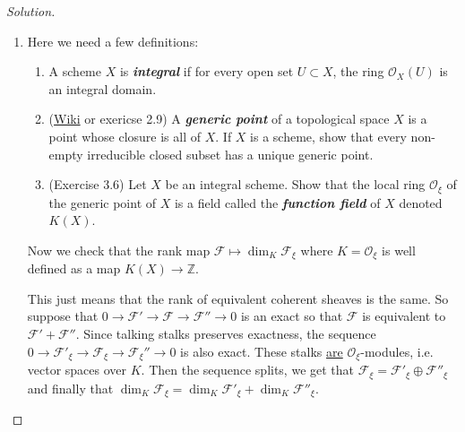 \begin{proof}[Solution]
\begin{enumerate}[label=\alph*.]
\begin{proof}[Proof 2, Solution manual]	Notice $\mathcal{O}_X\cong k[t]$. Locally finitely presentedness means locally there is an exact sequence $k[t]^{\oplus n}\to k[t]^{\oplus m}\to M\to 0$. But since {\color{6}$k[t]$ is a PID, the first morphism is injective}.

			Then we have an exact sequence $0\longrightarrow \mathcal{O}_X^{\oplus n} \to \mathcal{O}_X^{\oplus m} \to \mathcal{F}\to 0$. Which means that $\gamma(\mathcal{F})\cong (m-n)\gamma(\mathcal{O}_X)$.

			Then the map $\mathbb{Z}\longrightarrow K(X)$, $n\mapsto n\gamma(\mathcal{O}_X)$ is surjective.

			Finally, we need to use part (b).
\end{proof}

		\item Here we need a few definitions:

			\begin{defn}\leavevmode
				\begin{enumerate}
					\item A scheme $ X$ is \textit{\textbf{integral}} if for every open set $U\subset X$, the ring $\mathcal{O}_X(U)$ is an integral domain.
				
					\item (\href{https://en.wikipedia.org/wiki/Generic_point}{Wiki} or exericse 2.9) A  \textit{\textbf{generic point}} of a topological space $X$ is a point whose closure is all of $X$. If $X$ is a scheme, show that every non-empty irreducible closed subset has a unique generic point.

					\item (Exercise 3.6) Let $X$ be an integral scheme. Show that the local ring $\mathcal{O}_{\xi}$ of the generic point of $X$ is a field called the \textit{\textbf{function field}} of  $X$ denoted $K(X)$.
				\end{enumerate}
			\end{defn}
			Now we check that the rank map $\mathcal{F}\mapsto \dim_K\mathcal{F}_\xi$ where $K=\mathcal{O}_\xi$ is well defined as a map $K(X)\longrightarrow \mathbb{Z}$.

			This just means that the rank of equivalent coherent sheaves is the same. So suppose that $0\to \mathcal{F}'\to \mathcal{F}\to \mathcal{F}''\to 0$ is an exact so that $\mathcal{F}$ is equivalent to $\mathcal{F}'+\mathcal{F}''$. Since talking stalks preserves exactness, the sequence $0\to \mathcal{F}'_\xi\to \mathcal{F}_\xi\to \mathcal{F}_\xi''\to 0$ is also exact. These stalks \href{https://math.stackexchange.com/questions/918443/abstract-nonsense-proof-that-stalks-of-mathcalo-x-modules-are-modules-over}{are} $\mathcal{O}_\xi$-modules, i.e. vector spaces over $K$. Then the sequence splits, we get that  $\mathcal{F}_\xi=\mathcal{F}'_\xi\oplus \mathcal{F}''_\xi$ and finally that $\dim_K\mathcal{F}_\xi=\dim_K\mathcal{F}'_\xi+\dim_K\mathcal{F}''_\xi$.


\end{enumerate}
\end{proof}
